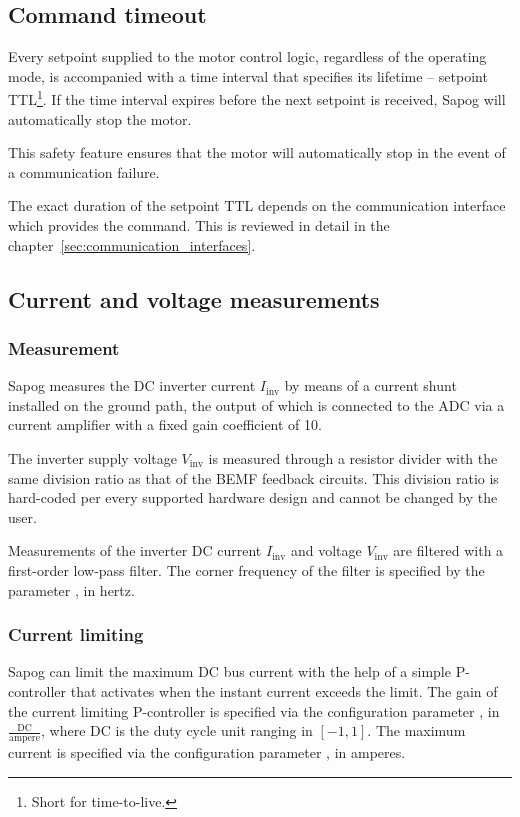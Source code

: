 \documentclass{zubaxdoc}
\begin{document}
\subsection{Command timeout}\label{sec:setpoint_ttl}

Every setpoint supplied to the motor control logic, regardless of the operating mode, is
accompanied with a time interval that specifies its lifetime -- setpoint TTL\footnote{Short for time-to-live.}.
If the time interval expires before the next setpoint is received, Sapog will automatically
stop the motor.

This safety feature ensures that the motor will automatically stop in the event of a communication failure.

The exact duration of the setpoint TTL depends on the communication interface which provides the command.
This is reviewed in detail in the chapter~\ref{sec:communication_interfaces}.

\subsection{Current and voltage measurements}

\subsubsection{Measurement}

Sapog measures the DC inverter current $I_\text{inv}$ by means of a current shunt installed on the ground path,
the output of which is connected to the ADC via a current amplifier with a fixed gain coefficient of 10.

The inverter supply voltage $V_\text{inv}$ is measured through a resistor divider with the same
division ratio as that of the BEMF feedback circuits.
This division ratio is hard-coded per every supported hardware design and cannot be changed by the user.

Measurements of the inverter DC current $I_\text{inv}$ and voltage $V_\text{inv}$
are filtered with a first-order low-pass filter.
The corner frequency of the filter is specified by the parameter , in hertz.

\subsubsection{Current limiting}\label{sec:current_limiting}

Sapog can limit the maximum DC bus current with the help of a simple P-controller
that activates when the instant current exceeds the limit.
The gain of the current limiting P-controller is specified via the configuration parameter
, in $\frac{\text{DC}}{\text{ampere}}$, where $\text{DC}$ is the duty cycle unit
ranging in $\left[-1, 1\right]$.
The maximum current is specified via the configuration parameter , in amperes.
\end{document}
